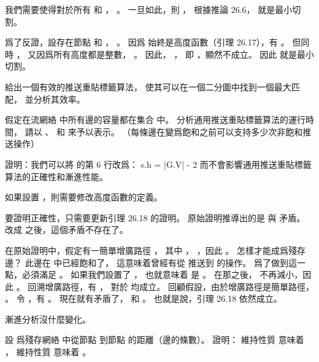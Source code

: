 我們需要使得對於所有  和 ， 。
一旦如此，則 ，
根據推論 26.6，  就是最小切割。

爲了反證，設存在節點  和 ， 。
因爲  始終是高度函數（引理 26.17），有 。
但同時 ，
又因爲所有高度都是整數， 。
因此， ，
即 ，顯然不成立。
因此  就是最小切割。

\stopANSWER

\startEXERCISE
給出一個有效的推送重貼標籤算法，
使其可以在一個二分圖中找到一個最大匹配，
並分析其效率。
\stopEXERCISE

\startANSWER
{}
\stopANSWER

\startEXERCISE
假定在流網絡  中所有邊的容量都在集合  中。
分析通用推送重貼標籤算法的運行時間，
請以 、  和  來予以表示。
（\hint 每條邊在變爲飽和之前可以支持多少次非飽和推送操作）
\stopEXERCISE

\startANSWER
{}
\stopANSWER

\startEXERCISE
證明：我們可以將  的第 6 行改爲：
\startformula
s.h = |G.V| - 2
\stopformula
而不會影響通用推送重貼標籤算法的正確性和漸進性能。
\stopEXERCISE

\startANSWER
如果設置 ，則需要修改高度函數的定義。

要證明正確性，只需要更新引理 26.18 的證明。
原始證明推導出的是  與  矛盾。
改成  之後，這個矛盾不存在了。

在原始證明中，假定有一簡單增廣路徑 ，
其中 ， ，因此 。
  怎樣才能成爲殘存邊？
此邊在  中已經飽和了，
這意味着曾經有從  推送到  的操作。
爲了做到這一點，必須滿足 。
如果我們設置了 ，
也就意味着  是 。
在那之後，  不再減小，因此 。
回溯增廣路徑，有 ，
對於  均成立。
回顧假設，由於增廣路徑是簡單路徑， 。
令 ，有 。
現在就有矛盾了，  和 。
也就是說，引理 26.18 依然成立。

漸進分析沒什麼變化。
\stopANSWER

\startEXERCISE
設  爲殘存網絡  中從節點  到節點  的距離（邊的條數）。
證明：  維持性質  意味着 ，
維持性質  意味着 。
\stopEXERCISE

